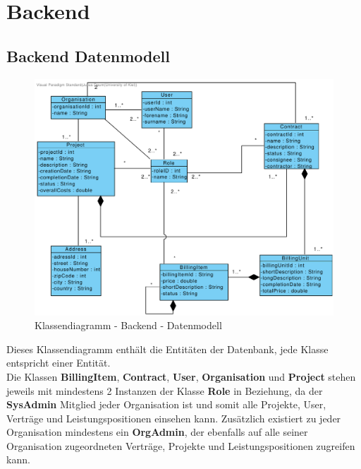 
\section{Backend}

\subsection{Backend Datenmodell}

\begin{figure}[h]
	\centering
	\includegraphics[width=15cm]{img/diagrams/class-diagram-backend.pdf}
	\caption{Klassendiagramm - Backend - Datenmodell}
	\label{fig:klassendiagramm-backend-model}
\end{figure}

\clearpage

\noindent
Dieses Klassendiagramm enthält die Entitäten der Datenbank, jede Klasse entspricht einer Entität. \\
Die Klassen \textbf{BillingItem}, \textbf{Contract}, \textbf{User}, \textbf{Organisation} und \textbf{Project} stehen jeweils mit mindestens 2 Instanzen der Klasse \textbf{Role} in Beziehung, da der \textbf{SysAdmin} Mitglied jeder Organisation ist und somit alle Projekte, User, Verträge und Leistungspositionen einsehen kann.
Zusätzlich existiert zu jeder Organisation mindestens ein \textbf{OrgAdmin}, der ebenfalls auf alle seiner Organisation zugeordneten Verträge, Projekte und Leistungspositionen zugreifen kann.
 
